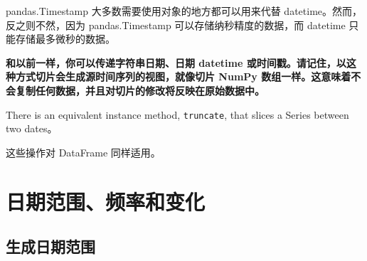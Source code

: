 pandas.Timestamp 大多数需要使用对象的地方都可以用来代替 datetime。然而，反之则不然，因为 pandas.Timestamp 可以存储纳秒精度的数据，而 datetime 只能存储最多微秒的数据。

\textbf{和以前一样，你可以传递字符串日期、日期 datetime 或时间戳。请记住，以这种方式切片会生成源时间序列的视图，就像切片 NumPy 数组一样。这意味着不会复制任何数据，并且对切片的修改将反映在原始数据中。}

There is an equivalent instance method, \verb|truncate|, that slices a Series between two dates。

这些操作对 DataFrame 同样适用。

\section{日期范围、频率和变化}
\subsection{生成日期范围}

